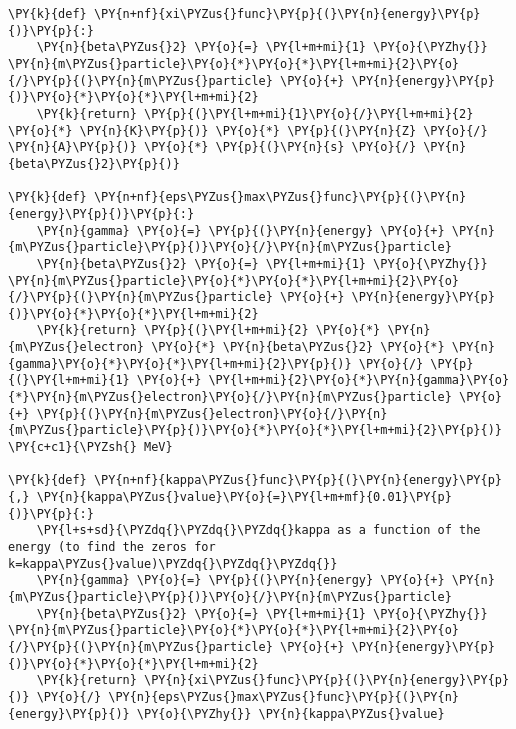     \begin{tcolorbox}[breakable, size=fbox, boxrule=1pt, pad at break*=1mm,colback=cellbackground, colframe=cellborder]
\begin{Verbatim}[commandchars=\\\{\}]
\PY{k}{def} \PY{n+nf}{xi\PYZus{}func}\PY{p}{(}\PY{n}{energy}\PY{p}{)}\PY{p}{:}
    \PY{n}{beta\PYZus{}2} \PY{o}{=} \PY{l+m+mi}{1} \PY{o}{\PYZhy{}} \PY{n}{m\PYZus{}particle}\PY{o}{*}\PY{o}{*}\PY{l+m+mi}{2}\PY{o}{/}\PY{p}{(}\PY{n}{m\PYZus{}particle} \PY{o}{+} \PY{n}{energy}\PY{p}{)}\PY{o}{*}\PY{o}{*}\PY{l+m+mi}{2}
    \PY{k}{return} \PY{p}{(}\PY{l+m+mi}{1}\PY{o}{/}\PY{l+m+mi}{2} \PY{o}{*} \PY{n}{K}\PY{p}{)} \PY{o}{*} \PY{p}{(}\PY{n}{Z} \PY{o}{/} \PY{n}{A}\PY{p}{)} \PY{o}{*} \PY{p}{(}\PY{n}{s} \PY{o}{/} \PY{n}{beta\PYZus{}2}\PY{p}{)}

\PY{k}{def} \PY{n+nf}{eps\PYZus{}max\PYZus{}func}\PY{p}{(}\PY{n}{energy}\PY{p}{)}\PY{p}{:}
    \PY{n}{gamma} \PY{o}{=} \PY{p}{(}\PY{n}{energy} \PY{o}{+} \PY{n}{m\PYZus{}particle}\PY{p}{)}\PY{o}{/}\PY{n}{m\PYZus{}particle}
    \PY{n}{beta\PYZus{}2} \PY{o}{=} \PY{l+m+mi}{1} \PY{o}{\PYZhy{}} \PY{n}{m\PYZus{}particle}\PY{o}{*}\PY{o}{*}\PY{l+m+mi}{2}\PY{o}{/}\PY{p}{(}\PY{n}{m\PYZus{}particle} \PY{o}{+} \PY{n}{energy}\PY{p}{)}\PY{o}{*}\PY{o}{*}\PY{l+m+mi}{2}
    \PY{k}{return} \PY{p}{(}\PY{l+m+mi}{2} \PY{o}{*} \PY{n}{m\PYZus{}electron} \PY{o}{*} \PY{n}{beta\PYZus{}2} \PY{o}{*} \PY{n}{gamma}\PY{o}{*}\PY{o}{*}\PY{l+m+mi}{2}\PY{p}{)} \PY{o}{/} \PY{p}{(}\PY{l+m+mi}{1} \PY{o}{+} \PY{l+m+mi}{2}\PY{o}{*}\PY{n}{gamma}\PY{o}{*}\PY{n}{m\PYZus{}electron}\PY{o}{/}\PY{n}{m\PYZus{}particle} \PY{o}{+} \PY{p}{(}\PY{n}{m\PYZus{}electron}\PY{o}{/}\PY{n}{m\PYZus{}particle}\PY{p}{)}\PY{o}{*}\PY{o}{*}\PY{l+m+mi}{2}\PY{p}{)} \PY{c+c1}{\PYZsh{} MeV}

\PY{k}{def} \PY{n+nf}{kappa\PYZus{}func}\PY{p}{(}\PY{n}{energy}\PY{p}{,} \PY{n}{kappa\PYZus{}value}\PY{o}{=}\PY{l+m+mf}{0.01}\PY{p}{)}\PY{p}{:}
    \PY{l+s+sd}{\PYZdq{}\PYZdq{}\PYZdq{}kappa as a function of the energy (to find the zeros for k=kappa\PYZus{}value)\PYZdq{}\PYZdq{}\PYZdq{}}
    \PY{n}{gamma} \PY{o}{=} \PY{p}{(}\PY{n}{energy} \PY{o}{+} \PY{n}{m\PYZus{}particle}\PY{p}{)}\PY{o}{/}\PY{n}{m\PYZus{}particle}
    \PY{n}{beta\PYZus{}2} \PY{o}{=} \PY{l+m+mi}{1} \PY{o}{\PYZhy{}} \PY{n}{m\PYZus{}particle}\PY{o}{*}\PY{o}{*}\PY{l+m+mi}{2}\PY{o}{/}\PY{p}{(}\PY{n}{m\PYZus{}particle} \PY{o}{+} \PY{n}{energy}\PY{p}{)}\PY{o}{*}\PY{o}{*}\PY{l+m+mi}{2}
    \PY{k}{return} \PY{n}{xi\PYZus{}func}\PY{p}{(}\PY{n}{energy}\PY{p}{)} \PY{o}{/} \PY{n}{eps\PYZus{}max\PYZus{}func}\PY{p}{(}\PY{n}{energy}\PY{p}{)} \PY{o}{\PYZhy{}} \PY{n}{kappa\PYZus{}value}
\end{Verbatim}
\end{tcolorbox}

